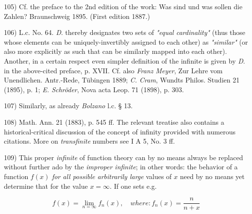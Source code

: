 \vfill
\leftline{\rule{2in}{0.4pt}}
\vspace{0.2cm}
{
\footnotesize
105) Cf. the preface to the 2nd edition of the work: Was sind und was sollen die Zahlen? Braunschweig 1895. (First edition 1887.)

106) L.c. No. 64. \textit{D}. thereby designates two sets of \textit{"equal cardinality"} (thus those whose elements can be uniquely-invertibly assigned to each other) as \textit{"similar"} (or also more explicitly as such that can be similarly mapped into each other). Another, in a certain respect even simpler definition of the infinite is given by \textit{D}. in the above-cited preface, p. XVII. Cf. also \textit{Franz Meyer}, Zur Lehre vom Unendlichen. Antr.-Rede, Tübingen 1889; \textit{C. Cram}, Wundts Philos. Studien 21 (1895), p. 1; \textit{E. Schröder}, Nova acta Leop. 71 (1898), p. 303.

107) Similarly, as already \textit{Bolzano} l.c. § 13.

108) Math. Ann. 21 (1883), p. 545 ff. The relevant treatise also contains a historical-critical discussion of the concept of infinity provided with numerous citations. More on \textit{transfinite} numbers see I A 5, No. 3 ff.

109) This proper \textit{infinite} of function theory can by no means always be replaced without further ado by the \textit{improper infinite}; in other words: the behavior of a function $f(x)$ \textit{for all possible arbitrarily large} values of $x$ need by no means yet determine that for the value $x = \infty$. If one sets e.g. 

$$f(x) = \lim_{n=\infty} f_n(x), \quad  where: f_n(x) = \frac{n}{n+x}$$

}